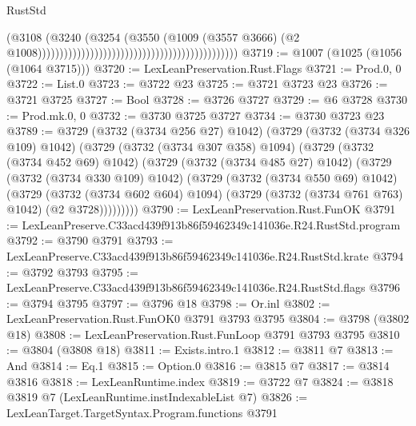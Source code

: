 \begin{lexlean}{RustStd}
\begin{coremodule}
                                                                                    (@3108
                                                                                      (@3240
                                                                                        (@3254
                                                                                          (@3550
                                                                                            (@1009
                                                                                              (@3557
                                                                                                @3666)
                                                                                              (@2
                                                                                                @1008))))))))))))))))))))))))))))))))))))))))))))))
@3719 := @1007 (@1025 (@1056 (@1064 @3715)))
@3720 := LexLeanPreservation.Rust.Flags
@3721 := Prod.{0, 0}
@3722 := List.{0}
@3723 := @3722 @23
@3725 := @3721 @3723 @23
@3726 := @3721 @3725
@3727 := Bool
@3728 := @3726 @3727
@3729 := @6 @3728
@3730 := Prod.mk.{0, 0}
@3732 := @3730 @3725 @3727
@3734 := @3730 @3723 @23
@3789 := @3729
    (@3732 (@3734 @256 @27) @1042)
    (@3729
      (@3732 (@3734 @326 @109) @1042)
      (@3729
        (@3732 (@3734 @307 @358) @1094)
        (@3729
          (@3732 (@3734 @452 @69) @1042)
          (@3729
            (@3732 (@3734 @485 @27) @1042)
            (@3729
              (@3732 (@3734 @330 @109) @1042)
              (@3729
                (@3732 (@3734 @550 @69) @1042)
                (@3729
                  (@3732 (@3734 @602 @604) @1094)
                  (@3729 (@3732 (@3734 @761 @763) @1042) (@2 @3728)))))))))
@3790 := LexLeanPreservation.Rust.FunOK
@3791 := LexLeanPreserve.C33acd439f913b86f59462349c141036e.R24.RustStd.program
@3792 := @3790 @3791
@3793 := LexLeanPreserve.C33acd439f913b86f59462349c141036e.R24.RustStd.krate
@3794 := @3792 @3793
@3795 := LexLeanPreserve.C33acd439f913b86f59462349c141036e.R24.RustStd.flags
@3796 := @3794 @3795
@3797 := @3796 @18
@3798 := Or.inl
@3802 := LexLeanPreservation.Rust.FunOK0 @3791 @3793 @3795
@3804 := @3798 (@3802 @18)
@3808 := LexLeanPreservation.Rust.FunLoop @3791 @3793 @3795
@3810 := @3804 (@3808 @18)
@3811 := Exists.intro.{1}
@3812 := @3811 @7
@3813 := And
@3814 := Eq.{1}
@3815 := Option.{0}
@3816 := @3815 @7
@3817 := @3814 @3816
@3818 := LexLeanRuntime.index
@3819 := @3722 @7
@3824 := @3818 @3819 @7 (LexLeanRuntime.instIndexableList @7)
@3826 := LexLeanTarget.TargetSyntax.Program.functions @3791

\end{coremodule}
\end{lexlean}
